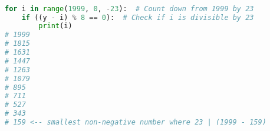 \documentclass[12pt]{article}
\newenvironment{exercise}[2][Exercise]{\begin{trivlist}
\item[\hskip \labelsep {\bfseries #1}\hskip \labelsep {\bfseries #2.}]}{\end{trivlist}}
\begin{document}
\begin{exercise}{3} 
\begin{lstlisting}[language=Python]

for i in range(1999, 0, -23):  # Count down from 1999 by 23
	if ((y - i) % 8 == 0):  # Check if i is divisible by 23
		print(i)  
# 1999
# 1815
# 1631
# 1447
# 1263
# 1079
# 895
# 711
# 527
# 343
# 159 <-- smallest non-negative number where 23 | (1999 - 159)

\end{lstlisting}
\end{exercise}


\hfill
\end{document}
